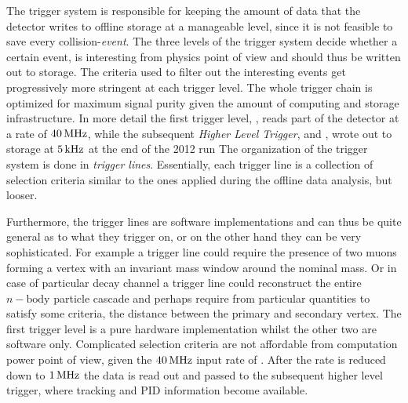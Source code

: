 
The trigger system is responsible for keeping the amount of data that the detector writes to offline storage
at a manageable level, since it is not feasible to save every collision-{\it event}. The three levels of
the \lhcb trigger system decide whether a certain event, is interesting from physics point
of view and should thus be written out to storage. The criteria used to filter out the interesting events 
get progressively more stringent at each trigger level. The whole trigger chain is optimized for maximum
signal purity given the amount of computing and storage infrastructure. In more detail the first trigger
level, \lzero, reads part of the detector at a rate of $40{\rm \,MHz}$, while the subsequent {\it Higher Level Trigger},
\hltone and \hlttwo, wrote out to storage at $5{\rm \,kHz}$ at the end of the 2012 run The organization of the trigger 
system is done in {\it trigger lines}. Essentially, each trigger line is a collection of selection criteria similar 
to the ones applied during the offline data analysis, but looser. 

Furthermore, the \hlt trigger lines are software
implementations and can thus be quite general as to what they trigger on, or on the other hand they can
be very sophisticated. For example a trigger line could require the presence of two muons forming a vertex 
with an invariant mass window around the nominal \jpsi mass. Or in case of particular decay channel a 
trigger line could reconstruct the entire $n-\text{body}$ particle cascade and perhaps require from 
particular quantities to satisfy some criteria, \ie the distance between the primary and secondary vertex.   
The first trigger level is a pure hardware implementation whilst the other two are software only.
Complicated selection criteria are not affordable from computation power point of view, given the
$40{\rm \,MHz}$ input rate of \lzero. After the rate is reduced down to $1{\rm \,MHz}$ the data is read out and
passed to the subsequent higher level trigger, where tracking and PID information become available.

